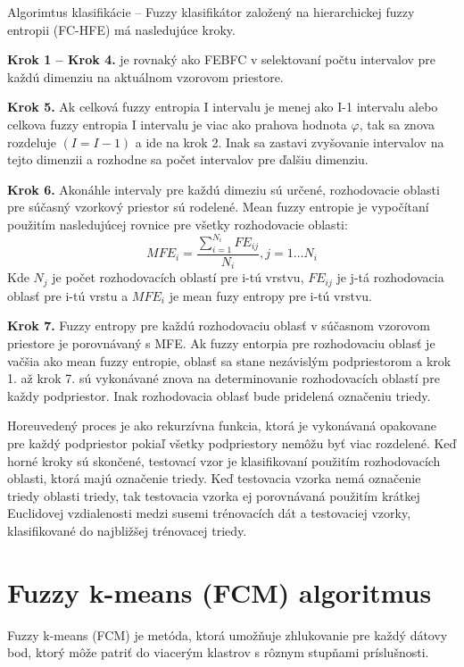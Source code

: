 {Algorimtus klasifikácie – Fuzzy klasifikátor založený na hierarchickej fuzzy entropii (FC-HFE)} má nasledujúce kroky. 

\textbf{Krok 1 – Krok 4.} je rovnaký ako FEBFC v selektovaní počtu intervalov pre každú dimenziu na aktuálnom vzorovom priestore. 

\textbf{Krok 5.} Ak celková fuzzy entropia I intervalu je menej ako I-1 intervalu alebo celkova fuzzy entropia I intervalu je viac ako prahova hodnota $\varphi$, tak sa znova rozdeluje $(I = I - 1)$ a ide na krok 2. Inak sa zastavi zvyšovanie intervalov na tejto dimenzii a rozhodne sa počet intervalov pre ďalšiu dimenziu. 

\textbf{Krok 6.} Akonáhle intervaly pre každú dimeziu sú určené, rozhodovacie oblasti pre súčasný vzorkový priestor sú rodelené. Mean fuzzy entropie je vypočítaní použitím nasledujúcej rovnice pre všetky rozhodovacie oblasti: 
$$MFE_i =  \frac{\sum\limits_{i=1}^{N_i}FE_{ij}}{ N_i},  j=1…N_i$$
Kde $N_j$ je počet rozhodovacích oblastí pre i-tú vrstvu, $FE_{ij}$ je j-tá rozhodovacia oblasť pre i-tú vrstu a $MFE_i$ je mean fuzy entropy pre i-tú vrstvu. 

\textbf{Krok 7.} Fuzzy entropy pre každú rozhodovaciu oblasť v súčasnom vzorovom priestore je porovnávaný s MFE. Ak fuzzy entorpia pre rozhodovaciu oblasť je vačšia ako mean fuzzy entropie, oblasť sa stane nezávislým podpriestorom a krok 1. až krok 7. sú vykonávané znova na determinovanie rozhodovacích oblastí pre každy podpriestor. Inak rozhodovacia oblasť bude pridelená označeniu triedy. 

Horeuvedený proces je ako rekurzívna funkcia, ktorá je vykonávaná opakovane pre každý podpriestor pokiaľ všetky podpriestory nemôžu byť viac rozdelené. Keď horné kroky sú skončené, testovací vzor je klasifikovaní použitím rozhodovacích oblasti, ktorá majú označenie triedy. Keď testovacia vzorka nemá označenie triedy oblasti triedy, tak testovacia vzorka ej porovnávaná použitím krátkej Euclidovej vzdialenosti medzi susemi trénovacích dát a testovaciej vzorky, klasifikované do najbližšej trénovacej triedy. 




\section{Fuzzy k-means (FCM) algoritmus}

Fuzzy k-means (FCM) je metóda, ktorá umožňuje zhlukovanie pre každý dátovy bod, ktorý môže patriť do viacerým klastrov s rôznym stupňami príslušnosti. 
\cite{Bezdec1981}

